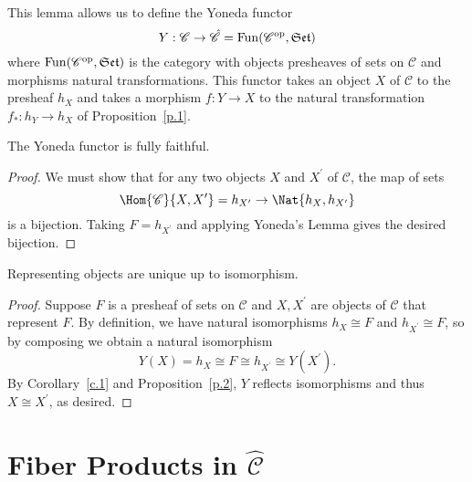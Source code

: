 \documentclass[10pt]{amsart}
\begin{document}
This lemma allows us to define the Yoneda functor
$$Y : \mathscr{C} \rightarrow \hat{\mathscr{C}} = \operatorname{Fun}(\mathscr{C}^\text{op}, \mathfrak{Set})$$
where $\operatorname{Fun}(\mathscr{C}^\text{op}, \mathfrak{Set})$ is the category with objects presheaves of sets on $\mathscr{C}$ and morphisms natural transformations.
This functor takes an object $X$ of $\mathscr{C}$ to the presheaf $h_X$ and takes a morphism $f : Y \rightarrow X$ to the natural transformation $f_* : h_Y \rightarrow h_X$ of Proposition~\ref{p.1}.

\begin{cor}\label{c.1}
  The Yoneda functor is fully faithful.

  \begin{proof}
    We must show that for any two objects $X$ and $X^\prime$ of $\mathscr{C}$, the map of sets
    $$\Hom{\mathscr{C}}{X,X^\prime} = h_{X^\prime} \rightarrow \Nat{h_X,h_{X^\prime}}$$
    is a bijection.
    Taking $F = h_{X^\prime}$ and applying Yoneda's Lemma gives the desired bijection.
  \end{proof}
\end{cor}

\begin{cor}
  Representing objects are unique up to isomorphism.

  \begin{proof}
    Suppose $F$ is a presheaf of sets on $\mathscr{C}$ and $X, X^\prime$ are objects of $\mathscr{C}$ that represent $F$.
    By definition, we have natural isomorphisms $h_X \cong F$ and $h_{X^\prime} \cong F$, so by composing we obtain a natural isomorphism
    $$Y(X) = h_X \cong F \cong h_{X^\prime} \cong Y(X^\prime).$$
    By Corollary~\ref{c.1} and Proposition~\ref{p.2}, $Y$ reflects isomorphisms and thus $X \cong X^\prime$, as desired.
  \end{proof}
\end{cor}

\section{Fiber Products in $\hat{\mathscr{C}}$}
\end{document}
